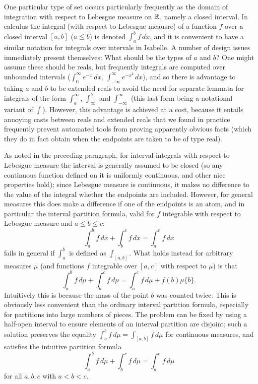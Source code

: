 \documentclass{amsart}
\theoremstyle{definition}
\theoremstyle{remark}
\begin{document}
One particular type of set occurs particularly frequently as the domain of integration with respect to Lebesgue measure on $\mathbb{R}$, namely a closed interval. In calculus the integral (with respect to Lebesgue meausre) of a function $f$ over a closed interval $[a,b]$ ($a \le b$) is denoted $\int_a^b f \, dx$, and it is convenient to have a similar notation for integrals over intervals in Isabelle. A number of design issues immediately present themselves: What should be the types of $a$ and $b$? One might assume these should be reals, but frequently integrals are computed over unbounded intervals ($\int_0^\infty e^{-x} \, dx$, $\int_{-\infty}^\infty e^{-x^2} \, dx$), and so there is advantage to taking $a$ and $b$ to be extended reals to avoid the need for separate lemmata for integrals of the form $\int_a^\infty$, $\int_{\infty}^b$ and $\int_{-\infty}^\infty$ (this last form being a notational variant of $\int$). However, this advantage is achieved at a cost, because it entails annoying casts between reals and extended reals that we found in practice frequently prevent automated tools from proving apparently obvious facts (which they do in fact obtain when the endpoints are taken to be of type real).

As noted in the preceding paragraph, for interval integrals with respect to Lebesgue measure the interval is generally assumed to be closed (so any continuous function defined on it is uniformly continuous, and other nice properties hold); since Lebesgue measure is continuous, it makes no difference to the value of the integral whether the endpoints are included. However, for general measures this does make a difference if one of the endpoints is an atom, and in particular the interval partition formula, valid for $f$ integrable with respect to Lebesgue measure and $a \le b \le c$:
\[ \int_a^b f \, dx + \int_b^c f \, dx = \int_a^c f \, dx \]
fails in general if $\int_a^b$ is defined as $\int_{[a,b]}$. What holds instead for arbitrary measures $\mu$ (and functions $f$ integrable over $[a,c]$ with respect to $\mu$) is that
\[ \int_a^b f \, d\mu + \int_b^c f \, d\mu = \int_a^c f \, d\mu + f(b)\mu \{b\}. \]
Intuitively this is because the mass of the point $b$ was counted twice. This is obviously less convenient than the ordinary interval partition formula, especially for partitions into large numbers of pieces. The problem can be fixed by using a half-open interval to ensure elements of an interval partition are disjoint; such a solution preserves the equality $\int_a^b f \, d\mu = \int_{[a,b]} f \, d\mu$ for continuous measures, and satisfies the intuitive partition formula
\[ \int_a^b f \, d\mu + \int_b^c f \, d\mu = \int_a^c f \, d\mu \]
for all $a,b,c$ with $a < b < c$.
\end{document}
